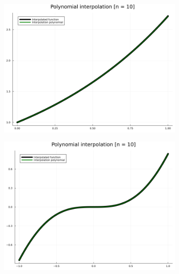 \documentclass[11pt]{article}
\begin{document}
\begin{figure}[htbp]
\begin{subfigure}[b]{0.45\textwidth}
                \includegraphics[width=\linewidth]{img/ex5_f1_n10.png}
            \end{subfigure}
            \hfill
            \begin{subfigure}[b]{0.45\textwidth}
                \includegraphics[width=\linewidth]{img/ex5_f2_n10.png}
            \end{subfigure}
            \begin{subfigure}[b]{0.45\textwidth}

\end{subfigure}
\end{figure}
\end{document}
